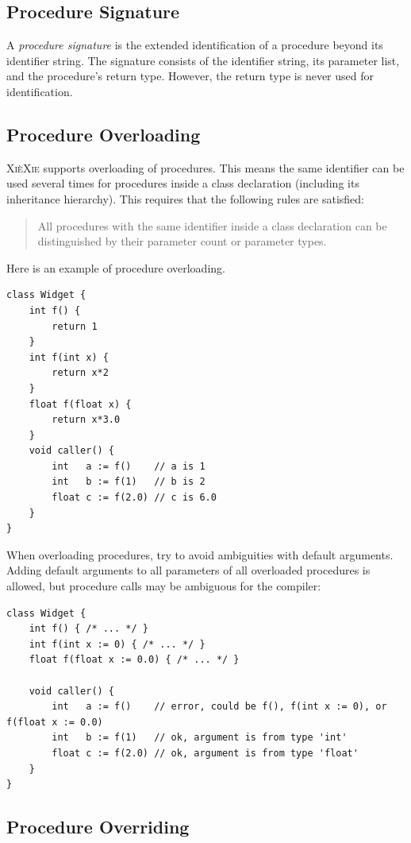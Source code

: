 \documentclass{report}
\def\xiexie{\textsc{Xi\`eXie}\xspace}
\begin{document}
\subsection{Procedure Signature}

A \textit{procedure signature} is the extended identification of a procedure beyond its identifier string.
The signature consists of the identifier string, its parameter list, and the procedure's return type.
However, the return type is never used for identification.

\subsection{Procedure Overloading}

\xiexie supports overloading of procedures. This means the same identifier can be used several times
for procedures inside a class declaration (including its inheritance hierarchy).
This requires that the following rules are satisfied:
\begin{quote}
	All procedures with the same identifier inside a class declaration can be distinguished by their
	parameter count or parameter types.
\end{quote}
Here is an example of procedure overloading.
\begin{lstlisting}
class Widget {
    int f() {
        return 1
    }
    int f(int x) {
        return x*2
    }
    float f(float x) {
        return x*3.0
    }
    void caller() {
        int   a := f()    // a is 1
        int   b := f(1)   // b is 2
        float c := f(2.0) // c is 6.0
    }
}
\end{lstlisting}
When overloading procedures, try to avoid ambiguities with default arguments. Adding default arguments
to all parameters of all overloaded procedures is allowed, but procedure calls may be ambiguous for the compiler:
\begin{lstlisting}
class Widget {
    int f() { /* ... */ }
    int f(int x := 0) { /* ... */ }
    float f(float x := 0.0) { /* ... */ }
    
    void caller() {
        int   a := f()    // error, could be f(), f(int x := 0), or f(float x := 0.0)
        int   b := f(1)   // ok, argument is from type 'int'
        float c := f(2.0) // ok, argument is from type 'float'
    }
}
\end{lstlisting}

\subsection{Procedure Overriding}
\end{document}
